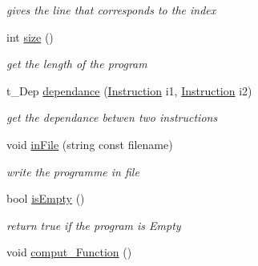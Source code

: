 \begin{DoxyCompactItemize}
\begin{DoxyCompactList}\small\item\em gives the line that corresponds to the index \item\end{DoxyCompactList}\item 
\hypertarget{classProgram_a190f24ecadca14d748408c352aabc219}{
int \hyperlink{classProgram_a190f24ecadca14d748408c352aabc219}{size} ()}
\label{classProgram_a190f24ecadca14d748408c352aabc219}

\begin{DoxyCompactList}\small\item\em get the length of the program \item\end{DoxyCompactList}\item 
t\_\-Dep \hyperlink{classProgram_a9626cf3dd2cd7851fb28d84fd6632f52}{dependance} (\hyperlink{classInstruction}{Instruction} i1, \hyperlink{classInstruction}{Instruction} i2)
\begin{DoxyCompactList}\small\item\em get the dependance betwen two instructions \item\end{DoxyCompactList}\item 
\hypertarget{classProgram_a1d7862832ff52e24f864a771b8c2f376}{
void \hyperlink{classProgram_a1d7862832ff52e24f864a771b8c2f376}{inFile} (string const filename)}
\label{classProgram_a1d7862832ff52e24f864a771b8c2f376}

\begin{DoxyCompactList}\small\item\em write the programme in file \item\end{DoxyCompactList}\item 
\hypertarget{classProgram_a4cba05aa33b330dcdaeae7f6d196328a}{
bool \hyperlink{classProgram_a4cba05aa33b330dcdaeae7f6d196328a}{isEmpty} ()}
\label{classProgram_a4cba05aa33b330dcdaeae7f6d196328a}

\begin{DoxyCompactList}\small\item\em return true if the program is Empty \item\end{DoxyCompactList}\item 
\hypertarget{classProgram_a316b99cea93e4ff48c35c72d0ee9f318}{
void \hyperlink{classProgram_a316b99cea93e4ff48c35c72d0ee9f318}{comput\_\-Function} ()}
\label{classProgram_a316b99cea93e4ff48c35c72d0ee9f318}


\end{DoxyCompactItemize}
